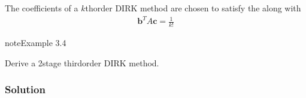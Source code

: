 \documentclass[letterpaper,10pt,english]{jupyterBook}
\begin{document}
\sphinxAtStartPar
The coefficients of a \(k\)th\sphinxhyphen{}order DIRK method are chosen to satisfy the {\hyperref[\detokenize{3_IRKs/3.0_IRKs:bk-ck-dk-order-conditions}]{}} along with
\begin{equation}\label{equation:3_IRKs/3.1_Deriving_IRK_methods:dirk-order-condition}
\begin{split}\mathbf{b}^T A\mathbf{c}=\frac{1}{k!}\end{split}
\end{equation}
\begin{sphinxadmonition}{note}{Example 3.4}

\sphinxAtStartPar
Derive a 2\sphinxhyphen{}stage third\sphinxhyphen{}order DIRK method.
\subsubsection*{Solution}


\end{sphinxadmonition}
\end{document}
